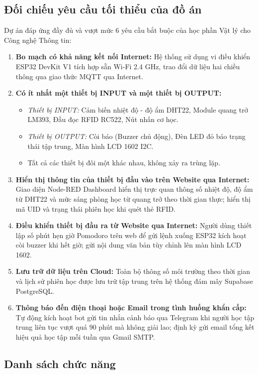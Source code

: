 \subsection{Đối chiếu yêu cầu tối thiểu của đồ án}

Dự án đáp ứng đầy đủ và vượt mức 6 yêu cầu bắt buộc của học phần Vật lý cho Công nghệ Thông tin:
\begin{enumerate}
    \item \textbf{Bo mạch có khả năng kết nối Internet:} Hệ thống sử dụng vi điều khiển ESP32 DevKit V1 tích hợp sẵn Wi-Fi 2.4 GHz, trao đổi dữ liệu hai chiều thông qua giao thức MQTT qua Internet.
    \item \textbf{Có ít nhất một thiết bị INPUT và một thiết bị OUTPUT:}
    \begin{itemize}
        \item \textit{Thiết bị INPUT:} Cảm biến nhiệt độ - độ ẩm DHT22, Module quang trở LM393, Đầu đọc RFID RC522, Nút nhấn cơ học.
        \item \textit{Thiết bị OUTPUT:} Còi báo (Buzzer chủ động), Đèn LED đỏ báo trạng thái tập trung, Màn hình LCD 1602 I2C.
        \item Tất cả các thiết bị đôi một khác nhau, không xảy ra trùng lặp.
    \end{itemize}
    \item \textbf{Hiển thị thông tin của thiết bị đầu vào trên Website qua Internet:} Giao diện Node-RED Dashboard hiển thị trực quan thông số nhiệt độ, độ ẩm từ DHT22 và mức sáng phòng học từ quang trở theo thời gian thực; hiển thị mã UID và trạng thái phiên học khi quét thẻ RFID.
    \item \textbf{Điều khiển thiết bị đầu ra từ Website qua Internet:} Người dùng thiết lập số phút hẹn giờ Pomodoro trên web để gửi lệnh xuống ESP32 kích hoạt còi buzzer khi hết giờ; gửi nội dung văn bản tùy chỉnh lên màn hình LCD 1602.
    \item \textbf{Lưu trữ dữ liệu trên Cloud:} Toàn bộ thông số môi trường theo thời gian và lịch sử phiên học được lưu trữ tập trung trên hệ thống đám mây Supabase PostgreSQL.
    \item \textbf{Thông báo đến điện thoại hoặc Email trong tình huống khẩn cấp:} Tự động kích hoạt bot gửi tin nhắn cảnh báo qua Telegram khi người học tập trung liên tục vượt quá 90 phút mà không giải lao; định kỳ gửi email tổng kết hiệu quả học tập mỗi tuần qua Gmail SMTP.
\end{enumerate}

\subsection{Danh sách chức năng}

